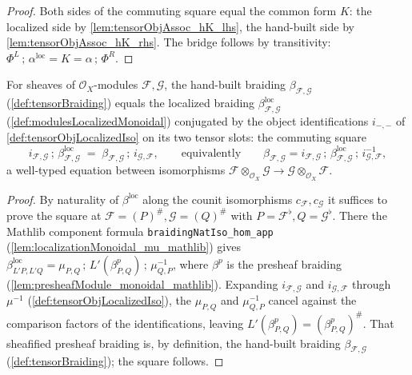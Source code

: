 \begin{proof}
  Both sides of the commuting square equal the common form \(K\): the localized
  side by \cref{lem:tensorObjAssoc_hK_lhs}, the hand-built side by
  \cref{lem:tensorObjAssoc_hK_rhs}. The bridge follows by transitivity:
  \(\Phi^{L}\,;\,\alpha^{\mathrm{loc}} = K = \alpha\,;\,\Phi^{R}\).
\end{proof}

\begin{lemma}
  \label{lem:tensorBraiding_eq_localizedBraiding}
  For sheaves of \(\mathcal{O}_X\)-modules \(\mathcal{F}, \mathcal{G}\), the
  hand-built braiding \(\beta_{\mathcal{F},\mathcal{G}}\)
  (\cref{def:tensorBraiding}) equals the localized braiding
  \(\beta^{\mathrm{loc}}_{\mathcal{F},\mathcal{G}}\)
  (\cref{def:modulesLocalizedMonoidal}) conjugated by the object identifications
  \(i_{-,-}\) of \cref{def:tensorObjLocalizedIso} on its two tensor slots: the
  commuting square
  \[
    i_{\mathcal{F},\mathcal{G}} \,;\,
      \beta^{\mathrm{loc}}_{\mathcal{F},\mathcal{G}}
      \;=\;
      \beta_{\mathcal{F},\mathcal{G}} \,;\, i_{\mathcal{G},\mathcal{F}},
    \qquad\text{equivalently}\qquad
    \beta_{\mathcal{F},\mathcal{G}}
      = i_{\mathcal{F},\mathcal{G}} \,;\,
        \beta^{\mathrm{loc}}_{\mathcal{F},\mathcal{G}} \,;\,
        i_{\mathcal{G},\mathcal{F}}^{-1},
  \]
  a well-typed equation between isomorphisms
  \(\mathcal{F} \otimes_{\mathcal{O}_X} \mathcal{G} \to
  \mathcal{G} \otimes_{\mathcal{O}_X} \mathcal{F}\).
\end{lemma}

\begin{proof}
  By naturality of \(\beta^{\mathrm{loc}}\) along the counit isomorphisms
  \(c_{\mathcal{F}}, c_{\mathcal{G}}\) it suffices to prove the square at
  \(\mathcal{F} = (P)^{\#}, \mathcal{G} = (Q)^{\#}\) with \(P =
  \mathcal{F}^{\flat}, Q = \mathcal{G}^{\flat}\). There the Mathlib component
  formula \texttt{braidingNatIso\_hom\_app}
  (\cref{lem:localizationMonoidal_mu_mathlib}) gives
  \(\beta^{\mathrm{loc}}_{L'P, L'Q} = \mu_{P,Q}\,;\, L'(\beta^p_{P,Q})\,;\,
  \mu_{Q,P}^{-1}\), where \(\beta^p\) is the presheaf braiding
  (\cref{lem:presheafModule_monoidal_mathlib}). Expanding
  \(i_{\mathcal{F},\mathcal{G}}\) and \(i_{\mathcal{G},\mathcal{F}}\) through
  \(\mu^{-1}\) (\cref{def:tensorObjLocalizedIso}), the \(\mu_{P,Q}\) and
  \(\mu_{Q,P}^{-1}\) cancel against the comparison factors of the identifications,
  leaving \(L'(\beta^p_{P,Q}) = (\beta^p_{P,Q})^{\#}\). That sheafified presheaf
  braiding is, by definition, the hand-built braiding
  \(\beta_{\mathcal{F},\mathcal{G}}\) (\cref{def:tensorBraiding}); the square
  follows.
\end{proof}

